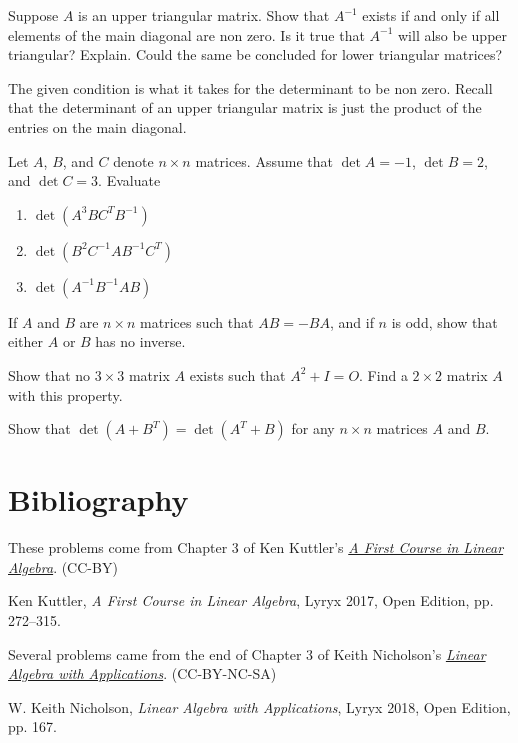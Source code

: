 \documentclass{ximera}
\begin{document}
\begin{problem}\label{prb:7.40} Suppose $A$ is an upper triangular matrix. Show that $A^{-1}$ exists
if and only if all elements of the main diagonal are non zero. Is it true
that $A^{-1}$ will also be upper triangular? Explain. Could the same be concluded for lower triangular matrices?
\begin{hint}
The given condition is what it takes for the
determinant to be non zero. Recall that the determinant of an upper
triangular matrix is just the product of the entries on the main diagonal.
\end{hint}
\end{problem}

\begin{problem}\label{prob:nich3.2.3}
Let $A$, $B$, and $C$ denote $n\times n$ matrices.  Assume that $\det A=-1$, $\det B=2$, and $\det C=3$.  Evaluate
\begin{enumerate}
    \item $\det (A^3BC^TB^{-1})$
    \item $\det (B^2C^{-1}AB^{-1}C^T)$
    \item $\det (A^{-1}B^{-1}AB)$
\end{enumerate}
    
\end{problem}

\begin{problem}\label{prob:nich3.2.12}
If $A$ and $B$ are $n\times n$ matrices such that $AB =-BA$, and if $n$ is odd, show that either $A$ or $B$ has no inverse.
\end{problem}

\begin{problem}\label{prob:nich3.2.16}
    Show that no $3\times 3$ matrix $A$ exists such
that $A^2+I = O$. Find a $2\times 2$ matrix $A$ with this property.
\end{problem}

\begin{problem}\label{prob:nich3.2.17}
    Show that $\det (A+B^T ) = \det (A^T +B)$
for any $n\times n$ matrices $A$ and $B$.
\end{problem}



\section*{Bibliography}

These problems come from Chapter 3 of Ken Kuttler's \href{https://open.umn.edu/opentextbooks/textbooks/a-first-course-in-linear-algebra-2017}{\it A First Course in Linear Algebra}. (CC-BY)

Ken Kuttler, {\it  A First Course in Linear Algebra}, Lyryx 2017, Open Edition, pp. 272--315.  

Several problems came from the end of Chapter 3 of Keith Nicholson's \href{https://open.umn.edu/opentextbooks/textbooks/linear-algebra-with-applications}{\it Linear Algebra with Applications}. (CC-BY-NC-SA)

W. Keith Nicholson, {\it Linear Algebra with Applications}, Lyryx 2018, Open Edition, pp. 167. 
\end{document}
